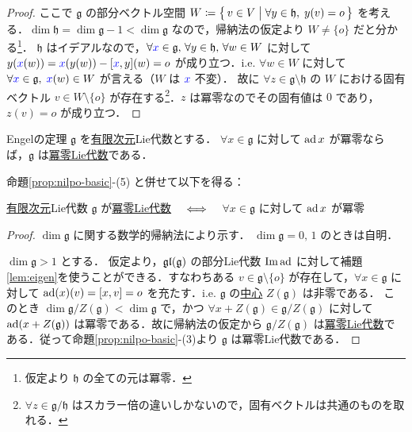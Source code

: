 \documentclass[rep_main]{subfiles}
\begin{document}
\begin{proof}
    ここで $\mathfrak{g}$ の部分ベクトル空間 $W \coloneqq \bigl\{\, v \in V \bigm| \forall y \in \mathfrak{h},\; y(v) = o \,\bigr\}$ を考える．$\dim \mathfrak{h} = \dim \mathfrak{g} - 1 < \dim \mathfrak{g}$ なので，帰納法の仮定より $W \neq \{o\}$ だと分かる\footnote{仮定より $\mathfrak{h}$ の全ての元は冪零．}．
    $\mathfrak{h}$ はイデアルなので，$\forall \textcolor{blue}{x} \in \mathfrak{g},\, \forall y \in \mathfrak{h},\, \forall w \in W$ に対して $y (\textcolor{blue}{x}(w)) = \textcolor{blue}{x} (y(w)) - \comm{\textcolor{blue}{x}}{y}(w) = o$ が成り立つ．i.e. $\forall w \in W$ に対して $\forall \textcolor{blue}{x} \in \mathfrak{g},\; \textcolor{blue}{x} (w) \in W$ が言える（$W$ は $\textcolor{blue}{x}$ 不変）．
    故に $\forall z \in \mathfrak{g} \setminus \mathfrak{h}$ の $W$ における固有ベクトル $v \in W \setminus \{o\}$ が存在する\footnote{$\forall z \in \mathfrak{g}/\mathfrak{h}$ はスカラー倍の違いしかないので，固有ベクトルは共通のものを取れる．}．$z$ は冪零なのでその固有値は $0$ であり，$z (v) = o$ が成り立つ．


\end{proof}


\begin{mytheo}[label=thm:Engel]{Engelの定理}
    $\mathfrak{g}$ を\underline{有限次元}Lie代数とする．
    $\forall x \in \mathfrak{g}$ に対して $\operatorname{ad} x$ が冪零ならば，$\mathfrak{g}$ は\hyperref[def:nilpotent-LieAlg]{冪零Lie代数}である．
\end{mytheo}

\begin{marker}
    命題\ref{prop:nilpo-basic}-(5) と併せて以下を得る：

    \underline{有限次元}Lie代数 $\mathfrak{g}$ が\hyperref[def:nilpotent-LieAlg]{冪零Lie代数} $\quad \Longleftrightarrow \quad$ $\forall x \in \mathfrak{g}$ に対して $\operatorname{ad} x$ が冪零
\end{marker}

\begin{proof}
    $\dim \mathfrak{g}$ に関する数学的帰納法により示す．
    $\dim \mathfrak{g} = 0,\, 1$ のときは自明．

    $\dim \mathfrak{g} > 1$ とする．
    仮定より，$\mathfrak{gl} (\mathfrak{g})$ の部分Lie代数 $\Im \operatorname{ad}$ に対して補題\ref{lem:eigen}を使うことができる．すなわちある $v \in \mathfrak{g} \setminus \{o\}$ が存在して，$\forall x \in \mathfrak{g}$ に対して $\ad(x)(v) = \comm{x}{v} = o$ を充たす．i.e. $\mathfrak{g}$ の\hyperref[def:center-LieAlg]{中心} $Z(\mathfrak{g})$ は非零である．
    このとき $\dim \mathfrak{g} / Z(\mathfrak{g}) < \dim \mathfrak{g}$ で，かつ $\forall x + Z(\mathfrak{g}) \in \mathfrak{g} / Z(\mathfrak{g})$ に対して $\operatorname{ad} (x + Z(\mathfrak{g}))$ は冪零である．故に帰納法の仮定から $\mathfrak{g} / Z(\mathfrak{g})$ は\hyperref[def:nilpotent-LieAlg]{冪零Lie代数}である．従って命題\ref{prop:nilpo-basic}-(3)より $\mathfrak{g}$ は冪零Lie代数である．
\end{proof}
\end{document}
